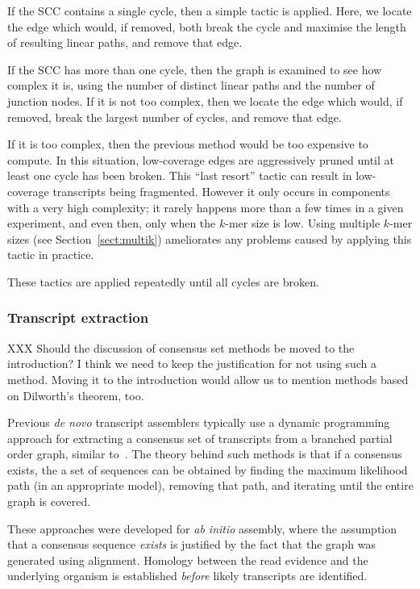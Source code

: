 \documentclass{bioinfo}
\def\abinitio{\textit{ab initio}}
\def\denovo{\textit{de novo}}
\def\kmer{$k$-mer}
\begin{document}
If the SCC contains a single cycle, then a simple tactic is applied.
Here, we locate the edge which would, if removed, both break the
cycle and maximise the length of resulting linear paths, and
remove that edge.

If the SCC has more than one cycle, then the graph is examined to
see how complex it is, using the number of distinct linear paths
and the number of junction nodes.
If it is not too complex, then
we locate the edge which would, if removed, break the largest number
of cycles, and remove that edge.

If it is too complex, then the previous method would be too expensive
to compute.
In this situation, low-coverage edges are aggressively pruned
until at least one cycle has been broken.
This ``last resort'' tactic can result in low-coverage transcripts
being fragmented.
However it only occurs in components with a very high complexity; it
rarely happens more than a few times in a given experiment, and even
then, only when the \kmer{} size is low.
Using multiple \kmer{} sizes (see Section~\ref{sect:multik}) ameliorates
any problems caused by applying this tactic in practice.

These tactics are applied repeatedly until all cycles are broken.

\subsubsection{Transcript extraction}

XXX Should the discussion of consensus set methods be moved to the
introduction? I think we need to keep the justification for not
using such a method. Moving it to the introduction would allow us
to mention methods based on Dilworth's theorem, too.

Previous \denovo{} transcript assemblers typically use a dynamic
programming approach for extracting a consensus set of transcripts
from a branched partial order graph, similar to~\cite{Lee:2003}.
The theory behind such methods is that if a consensus
exists, the a set of sequences can be obtained by finding
the maximum likelihood path (in an appropriate model), removing
that path, and iterating until the entire graph is covered.

These approaches were developed for \abinitio{} assembly, where the
assumption that a consensus sequence \textit{exists} is justified by
the fact that the graph was generated using alignment.
Homology between the read evidence and the underlying organism is
established \textit{before} likely transcripts are identified.
\end{document}
